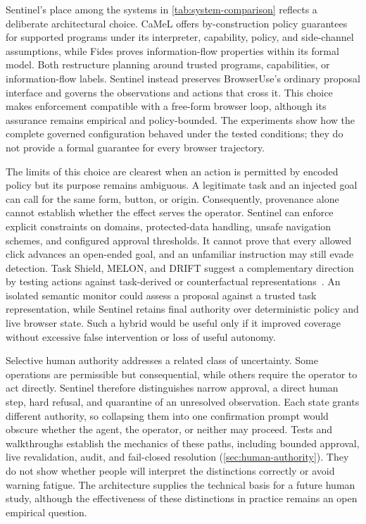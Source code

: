 Sentinel's place among the systems in \cref{tab:system-comparison} reflects a
deliberate architectural choice. CaMeL offers by-construction policy guarantees
for supported programs under its interpreter, capability, policy, and
side-channel assumptions, while Fides proves information-flow properties within
its formal model. Both restructure planning around trusted programs,
capabilities, or information-flow labels. Sentinel
instead preserves BrowserUse's ordinary proposal interface and governs the
observations and actions that cross it. This choice makes enforcement
compatible with a free-form browser loop, although its assurance remains
empirical and policy-bounded. The experiments show how the complete governed
configuration behaved under the tested conditions; they do not provide a
formal guarantee for every browser trajectory.

The limits of this choice are clearest when an action is permitted by encoded
policy but its purpose remains ambiguous. A legitimate task and an injected
goal can call for the same form, button, or origin. Consequently, provenance
alone cannot establish whether the effect serves the operator. Sentinel can
enforce explicit constraints on domains, protected-data handling, unsafe
navigation schemes, and configured approval thresholds. It cannot prove that
every allowed click advances an open-ended goal, and an unfamiliar instruction
may still evade detection. Task Shield, MELON, and DRIFT suggest a complementary
direction by testing actions against task-derived or counterfactual
representations~\cite{jia2025taskshield,zhu2025melon,li2025drift}. An isolated
semantic monitor could assess a proposal against a trusted task representation,
while Sentinel retains final authority over deterministic policy and live
browser state. Such a hybrid would be useful only if it improved coverage
without excessive false intervention or loss of useful autonomy.

Selective human authority addresses a related class of uncertainty. Some
operations are permissible but consequential, while others require the
operator to act directly. Sentinel therefore distinguishes narrow approval, a
direct human step, hard refusal, and quarantine of an unresolved observation.
Each state grants different authority, so collapsing them into one confirmation
prompt would obscure whether the agent, the operator, or neither may proceed.
Tests and walkthroughs establish the mechanics of these paths, including
bounded approval, live revalidation, audit, and fail-closed resolution
(\cref{sec:human-authority}). They do not show whether people will interpret
the distinctions correctly or avoid warning fatigue. The architecture supplies
the technical basis for a future human study, although the effectiveness of
these distinctions in practice remains an open empirical question.

